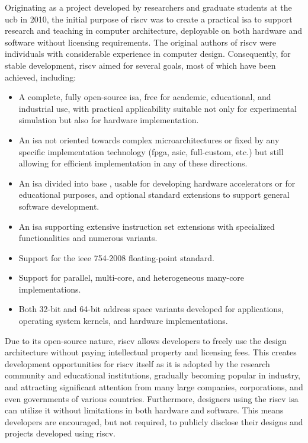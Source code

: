 Originating as a project developed by researchers and graduate students at the \acrlong{ucb} in 2010, the initial purpose of \acrshort{riscv} was to create a practical \acrshort{isa} to support research and teaching in computer architecture, deployable on both hardware and software without licensing requirements. The original authors of \acrshort{riscv} were individuals with considerable experience in computer design. Consequently, for stable development, \acrshort{riscv} aimed for several goals, most of which have been achieved, including:
\begin{itemize}
    \item A complete, fully open-source \acrshort{isa}, free for academic, educational, and industrial use, with practical applicability suitable not only for experimental simulation but also for hardware implementation.
    \item An \acrshort{isa} not oriented towards complex microarchitectures or fixed by any specific implementation technology (\acrshort{fpga}, \acrshort{asic}, full-custom, etc.) but still allowing for efficient implementation in any of these directions.
    \item An \acrshort{isa} divided into base , usable for developing hardware accelerators or for educational purposes, and optional standard extensions to support general software development.
    \item An \acrshort{isa} supporting extensive instruction set extensions with specialized functionalities and numerous variants.
    \item Support for the \acrshort{ieee} 754-2008 floating-point standard.
    \item Support for parallel, multi-core, and heterogeneous many-core implementations.
    \item Both 32-bit and 64-bit address space variants developed for applications, operating system kernels, and hardware implementations.
\end{itemize}

Due to its open-source nature, \acrshort{riscv} allows developers to freely use the design architecture without paying intellectual property and licensing fees. This creates development opportunities for \acrshort{riscv} itself as it is adopted by the research community and educational institutions, gradually becoming popular in industry, and attracting significant attention from many large companies, corporations, and even governments of various countries. Furthermore, designers using the \acrshort{riscv} \acrshort{isa} can utilize it without limitations in both hardware and software. This means developers are encouraged, but not required, to publicly disclose their designs and projects developed using \acrshort{riscv}.

